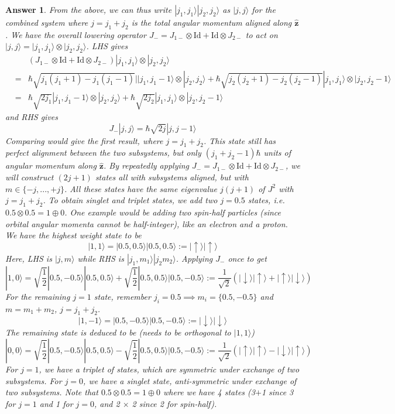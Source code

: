 \documentclass[a4paper]{article}
\newtheorem{ans}{Answer}[subsection]
\theoremstyle{new}
\begin{document}
\begin{ans}
From the above, we can thus write $|j_1,j_1\rangle|j_2,j_2\rangle$ as $|j,j\rangle$ for the combined system where $j=j_1+j_2$ is the total angular momentum aligned along $\mathbf{\hat{z}}$. We have the overall lowering operator $J_-=J_{1-}\otimes\text{Id}+\text{Id}\otimes J_{2-}$ to act on $|j,j\rangle=|j_1,j_1\rangle\otimes|j_2,j_2\rangle$. LHS gives
\begin{eqnarray}
& &(J_{1-}\otimes\text{Id}+\text{Id}\otimes J_{2-})|j_1,j_1\rangle\otimes|j_2,j_2\rangle\nonumber\\&=&\hbar\sqrt{j_1(j_1+1)-j_1(j_1-1)}||j_1,j_1-1\rangle\otimes|j_2,j_2\rangle+\hbar\sqrt{j_2(j_2+1)-j_2(j_2-1)}|j_1,j_1\rangle\otimes|j_2,j_2-1\rangle\nonumber\\&=&\hbar\sqrt{2j_1}|j_1,j_1-1\rangle\otimes|j_2,j_2\rangle+\hbar\sqrt{2j_2}|j_1,j_1\rangle\otimes|j_2,j_2-1\rangle\nonumber
\end{eqnarray}
and RHS gives
$$J_-|j,j\rangle=\hbar\sqrt{2j}|j,j-1\rangle$$
Comparing would give the first result, where $j=j_1+j_2$. This state still has perfect alignment between the two subsystems, but only $(j_1+j_2-1)\hbar$ units of angular momentum along $\mathbf{\hat{z}}$. By repeatedly applying $J_-=J_{1-}\otimes\text{Id}+\text{Id}\otimes J_{2-}$, we will construct $(2j+1)$ states all with subsystems aligned, but with $m\in\{-j,...,+j\}$. All these states have the same eigenvalue $j(j+1)$ of $J^2$ with $j=j_1+j_2$. To obtain singlet and triplet states, we add two $j=0.5$ states, i.e.  $0.5\otimes0.5=1\oplus0$. One example would be adding two spin-half particles (since orbital angular momenta cannot be half-integer), like an electron and a proton. We have the highest weight state to be $$|1,1\rangle=|0.5,0.5\rangle|0.5,0.5\rangle:=|\uparrow\rangle|\uparrow\rangle$$ 
Here, LHS is $|j,m\rangle$ while RHS is $|j_1,m_1\rangle|j_2m_2\rangle$. Applying $J_-$ once to get $$|1,0\rangle=\sqrt{\frac{1}{2}}|0.5,-0.5\rangle|0.5,0.5\rangle+\sqrt{\frac{1}{2}}|0.5,0.5\rangle|0.5,-0.5\rangle:=\frac{1}{\sqrt{2}}(|\downarrow\rangle|\uparrow\rangle+|\uparrow\rangle|\downarrow\rangle)$$
For the remaining $j=1$ state, remember $j_i=0.5\implies m_i=\{0.5,-0.5\}$ and $m=m_1+m_2$, $j=j_1+j_2$.
$$|1,-1\rangle=|0.5,-0.5\rangle|0.5,-0.5\rangle:=|\downarrow\rangle|\downarrow\rangle$$ 
The remaining state is deduced to be (needs to be orthogonal to $|1,1\rangle$)
$$|0,0\rangle=\sqrt{\frac{1}{2}}|0.5,-0.5\rangle|0.5,0.5\rangle-\sqrt{\frac{1}{2}}|0.5,0.5\rangle|0.5,-0.5\rangle:=\frac{1}{\sqrt{2}}(|\uparrow\rangle|\uparrow\rangle-|\downarrow\rangle|\uparrow\rangle)$$
For $j=1$, we have a triplet of states, which are symmetric under exchange of two subsystems. For $j=0$, we have a singlet state, anti-symmetric under exchange of two subsystems. Note that $0.5\otimes0.5=1\oplus0$ where we have 4 states (3$+$1 since 3 for $j=1$ and 1 for $j=0$, and 2 $\times$ 2 since 2 for spin-half).
\end{ans}
\end{document}
